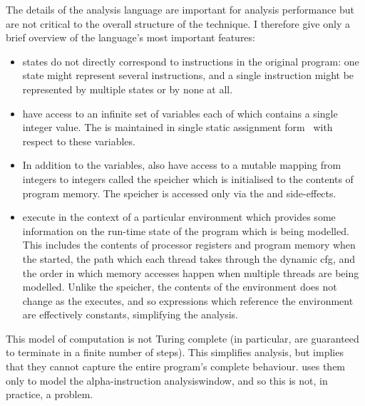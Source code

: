 The details of the analysis language are important for analysis
performance but are not critical to the overall structure of the
{\technique} technique.  I therefore give only a brief overview of the
language's most important features:
\begin{itemize}
\item {\STateMachine} states do not directly correspond to
  instructions in the original program: one state might represent
  several instructions, and a single instruction might be represented
  by multiple states or by none at all.
\item {\STateMachines} have access to an infinite set of
  {\StateMachine} variables each of which contains a single integer
  value.  The {\StateMachine} is maintained in single static
  assignment form~\cite{cytron1991} with respect to these variables.
\item In addition to the variables, {\StateMachines} also have access
  to a mutable mapping from integers to integers called the
  \gls{speicher} which is initialised to the contents of program
  memory.  The \gls{speicher} is accessed only via the 
  and  side-effects.
\item {\STateMachines} execute in the context of a particular
  \gls{environment} which provides some information on the run-time
  state of the program which is being modelled.  This includes the
  contents of processor registers and program memory when the
  {\StateMachine} started, the path which each thread takes through
  the \gls{dynamic cfg}, and the order in which memory accesses happen
  when multiple threads are being modelled.  Unlike the
  \gls{speicher}, the contents of the environment does not change as
  the {\StateMachine} executes, and so expressions which reference the
  environment are effectively constants, simplifying the analysis.
\end{itemize}
This model of computation is not Turing complete (in particular,
{\StateMachines} are guaranteed to terminate in a finite number of
steps).  This simplifies analysis, but implies that they cannot
capture the entire program's complete behaviour.  {\Technique} uses
them only to model the \gls{alpha}-instruction \gls{analysiswindow},
and so this is not, in practice, a problem.

